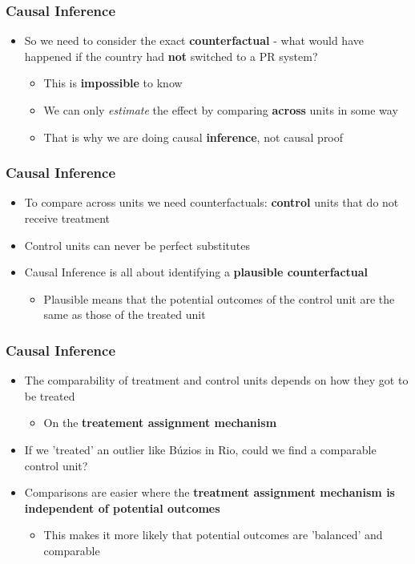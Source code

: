 \documentclass[xcolor=x11names,compress]{beamer}\usepackage[]{graphicx}\usepackage[]{color}
\renewcommand{\(}{\begin{columns}}
\renewcommand{\)}{\end{columns}}
\newcommand{\<}[1]{\begin{column}{#1}}
\renewcommand{\>}{\end{column}}
\begin{document}
\begin{frame}
\frametitle{Causal Inference}
\begin{itemize}
\item So we need to consider the exact \textbf{counterfactual} - what would have happened if the country had \textbf{not} switched to a PR system?
\pause
\begin{itemize}
\item This is \textbf{impossible} to know
\pause
\item We can only \textit{estimate} the effect by comparing \textbf{across} units in some way
\pause
\item That is why we are doing causal \textbf{inference}, not causal proof
\end{itemize}
\end{itemize}
\end{frame}

\begin{frame}
\frametitle{Causal Inference}
\begin{itemize}
\item To compare across units we need counterfactuals: \textbf{control} units that do not receive treatment
\item Control units can never be perfect substitutes
\item Causal Inference is all about identifying a \textbf{plausible counterfactual}
\begin{itemize}
\item Plausible means that the potential outcomes of the control unit are the same as those of the treated unit
\end{itemize}
\end{itemize}
\end{frame}

\begin{frame}
\frametitle{Causal Inference}
\begin{itemize}
\item The comparability of treatment and control units depends on how they got to be treated
\begin{itemize}
\item On the \textbf{treatement assignment mechanism}
\end{itemize}
\item If we 'treated' an outlier like B\'{u}zios in Rio, could we find a comparable control unit?
\item Comparisons are easier where the \textbf{treatment assignment mechanism is independent of potential outcomes}
\begin{itemize}
\item This makes it more likely that potential outcomes are 'balanced' and comparable
\end{itemize}
\end{itemize}
\end{frame}
\end{document}
